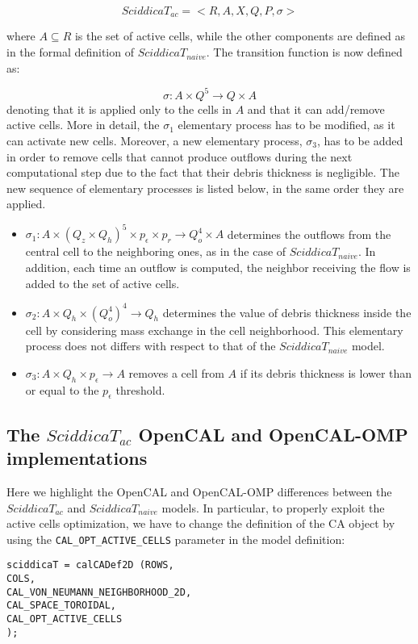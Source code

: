 $$SciddicaT_{ac} = < R, A, X, Q , P, \sigma >$$

\noindent where $A \subseteq R$ is the set of active cells, while
the other components are defined as in the formal definition of
$SciddicaT_{naive}$. The transition function is now defined as:

$$\sigma : A \times Q^5 \rightarrow Q \times A$$ denoting that it
is applied only to the cells in $A$ and that it can add/remove
active cells. More in detail, the $\sigma_1$ elementary process
has to be modified, as it can activate new cells. Moreover, a new
elementary process, $\sigma_3$, has to be added in order to remove
cells that cannot produce outflows during the next computational
step due to the fact that their debris thickness is
negligible. The new sequence of elementary processes is listed
below, in the same order they are applied.

\begin{itemize}
	\item $\sigma_1 : A \times (Q_z \times Q_h)^5 \times p_\epsilon
	\times p_r \rightarrow Q_o^4 \times A$ determines the outflows
	from the central cell to the neighboring ones, as in the case of
	$SciddicaT_{naive}$. In addition, each time an outflow is
	computed, the neighbor receiving the flow is added to the set of
	active cells.
	
	\item $\sigma_2: A \times Q_h \times (Q_o^4)^4 \rightarrow Q_h$
	determines the value of debris thickness inside the cell by
	considering mass exchange in the cell neighborhood. This
	elementary process does not differs with respect to that of the
	$SciddicaT_{naive}$ model.
	
	\item $\sigma_3: A \times Q_h \times p_\epsilon \rightarrow A$
	removes a cell from $A$ if its debris thickness is lower than or
	equal to the $p_\epsilon$ threshold.
\end{itemize}

\subsection{The $SciddicaT_{ac}$ OpenCAL and OpenCAL-OMP implementations}
Here we highlight the OpenCAL and OpenCAL-OMP differences between the $SciddicaT_{ac}$ and $SciddicaT_{naive}$ models. In particular, to properly exploit the active cells optimization, we have to change the definition of the CA object by using the \verb'CAL_OPT_ACTIVE_CELLS' parameter in the model
definition:
\begin{lstlisting}[basicstyle=\footnotesize, numbers=none]
sciddicaT = calCADef2D (ROWS,
COLS,
CAL_VON_NEUMANN_NEIGHBORHOOD_2D,
CAL_SPACE_TOROIDAL,
CAL_OPT_ACTIVE_CELLS
);
\end{lstlisting}

